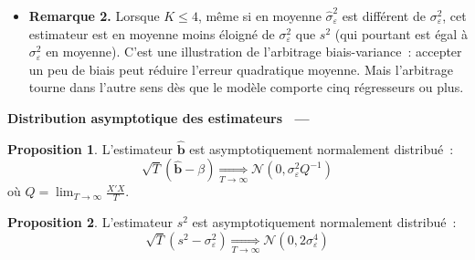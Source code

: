 \documentclass[10pt,a4paper]{article}
\makeatletter
\theoremstyle{definition}
\newtheorem{prop}{Proposition}
\renewcommand{\newline}{\unskip\par\vspace{1.5pt}}
\newenvironment{frame}[1][]{\par}{\par}
\newcommand{\frameheadrule}{%
  \par\nobreak\vspace{1pt}{\color{ctitle}\hrule height 0.6pt}\nobreak\vspace{4pt}}
\newcommand{\frametitle}[1]{%
  \par\addvspace{8pt plus 2pt}\needspace{6\baselineskip}%
  \noindent\begingroup\color{ctitle}\sffamily\bfseries\large #1\endgroup
  \@ifnextchar\framesubtitle{}{\frameheadrule}}
\newcommand{\framesubtitle}[1]{%
  \begingroup\color{ctitle}\sffamily\normalsize\ --- #1\endgroup\frameheadrule}
\makeatother
\begin{document}
\begin{notes}
\begin{itemize}
    \medskip

    On peut aller plus loin. Considérons la famille d'estimateurs $\nicefrac{SSE}{c}$, indexée par $c>0$, qui contient $s^2$ ($c=T-K$) et l'estimateur du maximum de vraisemblance ($c=T$). Puisque $\nicefrac{SSE}{\sigma_{\varepsilon}^2}\sim\chi^2(n)$ avec $n=T-K$, on a $\mathbb E[SSE]=n\sigma_{\varepsilon}^2$ et $\mathbb V[SSE]=2n\sigma_{\varepsilon}^4$, d'où~:
    \[
      MSE\left( \frac{SSE}{c} \right) = \sigma_{\varepsilon}^4\,\frac{2n + (n-c)^2}{c^2}
    \]
    En annulant la dérivée par rapport à $c$, on vérifie que cette quantité est minimale en $c = n+2$. \textbf{Ni $s^2$ ni l'estimateur du maximum de vraisemblance ne minimisent l'erreur quadratique moyenne}~: c'est $\nicefrac{SSE}{(T-K+2)}$ qui le fait. On retrouve alors la condition ci-dessus~: $c=T$ bat $c=n$ lorsque $T$ est plus proche de $n+2$ que ne l'est $n$, c'est-à-dire lorsque $K\leq 4$.\newline

  \item \textbf{Remarque 2.} Lorsque $K\leq 4$, même si en moyenne $\hat{\sigma}_{\varepsilon}^2$ est différent de $\sigma_{\varepsilon}^2$, cet estimateur est en moyenne moins éloigné de  $\sigma_{\varepsilon}^2$ que $s^2$ (qui pourtant est égal à  $\sigma_{\varepsilon}^2$ en moyenne). C'est une illustration de l'arbitrage biais-variance~: accepter un peu de biais peut réduire l'erreur quadratique moyenne. Mais l'arbitrage tourne dans l'autre sens dès que le modèle comporte cinq régresseurs ou plus.

  \end{itemize}

\end{notes}


\begin{frame}
  \frametitle{Distribution asymptotique des estimateurs}

  \begin{prop}\label{prop:asymptotic_dist:bhat}
    L'estimateur $\hat{\mathbf b}$ est asymptotiquement normalement distribué~:
    \[
      \sqrt{T}\left( \hat{\mathbf b} - \beta\right) \underset{T\to\infty}{\Longrightarrow} \mathcal N\left( 0, \sigma_{\varepsilon}^2 Q^{-1}\right)
    \]
    où $Q = \lim_{T\to\infty}\frac{X'X}{T}$.
  \end{prop}

  \bigskip

  \begin{prop}\label{prop:asymptotic_dist:s2}
    L'estimateur $s^2$ est asymptotiquement normalement distribué~:
    \[
      \sqrt{T}\left( s^2 - \sigma_{\varepsilon}^2\right) \underset{T\to\infty}{\Longrightarrow} \mathcal N\left( 0, 2\sigma_{\varepsilon}^4\right)
    \]
  \end{prop}

\end{frame}
\end{document}
